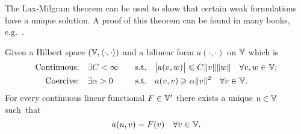 \documentclass[thesis.tex]{subfiles}
\begin{document}
The Lax-Milgram theorem can be used to show that certain weak formulations have a unique solution.
A proof of this theorem can be found in many books, e.g.~\cite[\S2]{brenner}.
\begin{thm}
  \label{thm:lax}
  Given a Hilbert space $(\mathbb{V}, \langle \cdot, \cdot \rangle)$ and a bilinear form $a(\cdot,\cdot)$ on $\mathbb{V}$ which is
  \begin{alignat*}{3}
    \text{Continuous:} \quad & \exists C < \infty \quad & \text{s.t.} \quad & \abs{a(v,w)} \leqslant C \|v\|\|w\| \quad \forall v,w \in \mathbb{V}; \\
    \text{Coercive:}   \quad & \exists \alpha > 0 \quad &\text{s.t.} \quad & a(v,v) \geqslant \alpha \|v\|^2 \quad \forall v \in \mathbb{V}.
  \end{alignat*}
  For every continuous linear functional $F \in \mathbb{V}'$ there exists a unique $u \in \mathbb{V}$ such~that
  \[
    a(u,v) = F(v) \quad \forall v\in \mathbb{V}.
  \]
\end{thm}
\end{document}
